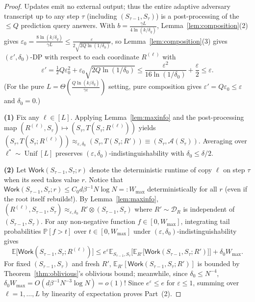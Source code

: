 \documentclass[11pt]{article}
\theoremstyle{definition}
\newcommand{\E}{\mathbb{E}}
\newcommand{\Prob}{\mathbb{P}}
\newcommand{\calA}{\mathcal{A}}
\newcommand{\calD}{\mathcal{D}}
\newcommand{\Unif}{\operatorname{Unif}}
\begin{document}
\begin{proof}
Updates emit no external output; thus the entire adaptive adversary transcript up to any step $\tau$ (including $(S_{\tau-1}, S_\tau)$) is a post-processing of the $\le Q$ prediction query answers. With $b = \frac{\gamma L}{4 \ln(k/\delta_q)}$, Lemma~\ref{lem:composition}(2) gives $\varepsilon_0 = \frac{8 \ln(k/\delta_q)}{\gamma L} \le \frac{\varepsilon}{2\sqrt{2Q\ln(1/\delta_0)}}$, so Lemma~\ref{lem:composition}(3) gives $(\varepsilon', \delta_0)$-DP with respect to each coordinate $R^{(\ell)}$ with
\[
    \varepsilon' = \tfrac{1}{2} Q \varepsilon_0^2 + \varepsilon_0 \sqrt{2Q\ln(1/\delta_0)} \le \frac{\varepsilon^2}{16\ln(1/\delta_0)} + \frac{\varepsilon}{2} \le \varepsilon.
\]
(For the pure $L = \Theta(\frac{Q \ln(k/\delta_q)}{\gamma \varepsilon})$ setting, pure composition gives $\varepsilon' = Q\varepsilon_0 \le \varepsilon$ and $\delta_0 = 0$.)

\textbf{(1)} Fix any $\ell \in [L]$. Applying Lemma~\ref{lem:maxinfo} and the post-processing map $(R^{(\ell)}, S_\tau) \mapsto (S_\tau, T(S_\tau; R^{(\ell)}))$ yields $(S_\tau, T(S_\tau; R^{(\ell)})) \approx_{\varepsilon, \delta_0} (S_\tau, T(S_\tau; R')) \equiv (S_\tau, \calA(S_\tau))$. Averaging over $\ell^* \sim \Unif[L]$ preserves $(\varepsilon, \delta_0)$-indistinguishability with $\delta_0 \le \delta/2$.

\textbf{(2)} Let $\mathsf{Work}(S_{\tau-1}, S_\tau; r)$ denote the deterministic runtime of copy $\ell$ on step $\tau$ when its seed takes value $r$. Notice that $\mathsf{Work}(S_{\tau-1}, S_\tau; r) \le C_0 d \beta^{-1} N \log N =: W_{\max}$ deterministically for all $r$ (even if the root itself rebuilds!). By Lemma~\ref{lem:maxinfo}, $(R^{(\ell)}, S_{\tau-1}, S_\tau) \approx_{\varepsilon, \delta_0} R' \otimes (S_{\tau-1}, S_\tau)$ where $R' \sim \calD_R$ is independent of $(S_{\tau-1}, S_\tau)$. For any non-negative function $f \in [0, W_{\max}]$, integrating tail probabilities $\Prob[f > t]$ over $t \in [0, W_{\max}]$ under $(\varepsilon, \delta_0)$-indistinguishability gives
\[
    \E\big[\mathsf{Work}(S_{\tau-1}, S_\tau; R^{(\ell)})\big] \le e^\varepsilon \E_{S_{\tau-1}, S_\tau}\Big[\E_{R'}\big[\mathsf{Work}(S_{\tau-1}, S_\tau; R')\big]\Big] + \delta_0 W_{\max}.
\]
For fixed $(S_{\tau-1}, S_\tau)$ and fresh $R'$, $\E_{R'}[\mathsf{Work}(S_{\tau-1}, S_\tau; R')]$ is bounded by Theorem~\ref{thm:oblivious}'s oblivious bound; meanwhile, since $\delta_0 \le N^{-4}$, $\delta_0 W_{\max} = O(d \beta^{-1} N^{-3} \log N) = o(1)$! Since $e^\varepsilon \le e$ for $\varepsilon \le 1$, summing over $\ell = 1, \dots, L$ by linearity of expectation proves Part~(2).
\end{proof}
\end{document}
